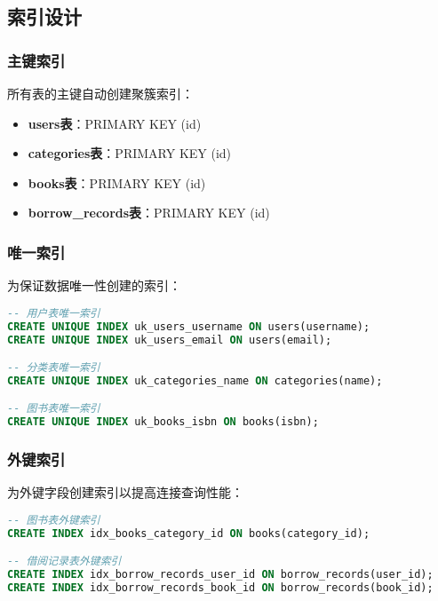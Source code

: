 \documentclass[12pt,a4paper]{article}
\begin{document}
\subsection{索引设计}

\subsubsection{主键索引}
所有表的主键自动创建聚簇索引：
\begin{itemize}
    \item \textbf{users表}：PRIMARY KEY (id)
    \item \textbf{categories表}：PRIMARY KEY (id)  
    \item \textbf{books表}：PRIMARY KEY (id)
    \item \textbf{borrow\_records表}：PRIMARY KEY (id)
\end{itemize}

\subsubsection{唯一索引}
为保证数据唯一性创建的索引：
\begin{lstlisting}[language=sql]
-- 用户表唯一索引
CREATE UNIQUE INDEX uk_users_username ON users(username);
CREATE UNIQUE INDEX uk_users_email ON users(email);

-- 分类表唯一索引  
CREATE UNIQUE INDEX uk_categories_name ON categories(name);

-- 图书表唯一索引
CREATE UNIQUE INDEX uk_books_isbn ON books(isbn);
\end{lstlisting}

\subsubsection{外键索引}
为外键字段创建索引以提高连接查询性能：
\begin{lstlisting}[language=sql]
-- 图书表外键索引
CREATE INDEX idx_books_category_id ON books(category_id);

-- 借阅记录表外键索引
CREATE INDEX idx_borrow_records_user_id ON borrow_records(user_id);
CREATE INDEX idx_borrow_records_book_id ON borrow_records(book_id);
\end{lstlisting}
\end{document}
